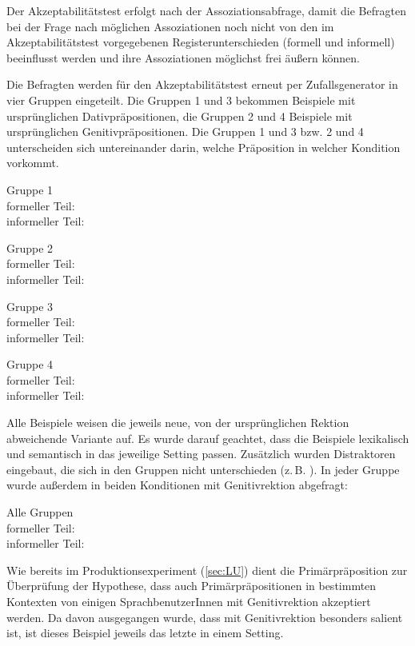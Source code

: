Der Akzeptabilitätstest erfolgt nach der Assoziationsabfrage, damit die Befragten bei der Frage nach möglichen Assoziationen noch nicht von den im Akzeptabilitätstest vorgegebenen Registerunterschieden (formell und informell) beeinflusst werden und ihre Assoziationen möglichst frei äußern können. 

Die Befragten werden für den Akzeptabilitätstest erneut per Zufallsgenerator in vier Gruppen eingeteilt. 
Die Gruppen 1 und 3 bekommen Beispiele mit ursprünglichen Dativpräpositionen, die Gruppen 2 und 4 Beispiele mit ursprünglichen Genitivpräpositionen. 
Die Gruppen 1 und 3 bzw. 2 und 4 unterscheiden sich untereinander darin, welche Präposition in welcher Kondition vorkommt. 
\begin{description}
\item Gruppe 1\\ formeller Teil: \\ informeller Teil: 
\item Gruppe 2\\ formeller Teil: \\ informeller Teil: 
\item Gruppe 3\\ formeller Teil: \\ informeller Teil: 
\item Gruppe 4\\ formeller Teil: \\ informeller Teil: 
\end{description}
Alle Beispiele weisen die jeweils neue, von der ursprünglichen Rektion abweichende Variante auf. 
Es wurde darauf geachtet, dass die Beispiele lexikalisch und semantisch in das jeweilige Setting passen. 
Zusätzlich wurden Distraktoren eingebaut, die sich in den Gruppen nicht unterschieden (z.\,B. ). 
In jeder Gruppe wurde außerdem in beiden Konditionen  mit Genitivrektion abgefragt:
\begin{description}
\item Alle Gruppen\\ formeller Teil: \\ informeller Teil: 
\end{description}
Wie bereits im Produktionsexperiment (\autoref{sec:LU}) dient die Primärpräposition zur Überprüfung der Hypothese, dass auch Primärpräpositionen in bestimmten Kontexten von einigen SprachbenutzerInnen mit Genitivrektion akzeptiert werden. 
Da davon ausgegangen wurde, dass  mit Genitivrektion besonders salient ist, ist dieses Beispiel jeweils das letzte in einem Setting. 

